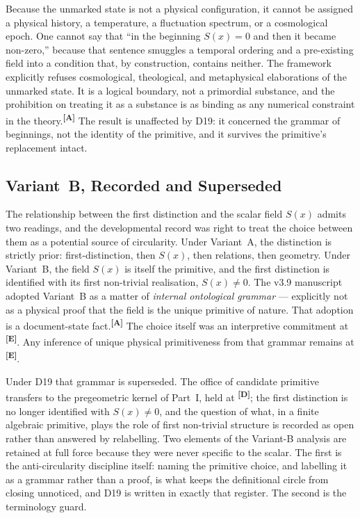 \documentclass[12pt,a4paper,twoside]{article}
\theoremstyle{plain}
\theoremstyle{definition}
\theoremstyle{remark}
\newcommand{\catmark}[1]{\textsuperscript{\textsf{\textbf{[#1]}}}}
\begin{document}
Because the unmarked state is not a physical configuration, it cannot be
assigned a physical history, a temperature, a fluctuation spectrum, or a
cosmological epoch. One cannot say that ``in the beginning $S(x)=0$ and
then it became non-zero,'' because that sentence smuggles a temporal
ordering and a pre-existing field into a condition that, by
construction, contains neither. The framework explicitly refuses
cosmological, theological, and metaphysical elaborations of the unmarked
state. It is a logical boundary, not a primordial substance, and the
prohibition on treating it as a substance is as binding as any numerical
constraint in the theory.\catmark{A} The result is unaffected by D19:
it concerned the grammar of beginnings, not the identity of the
primitive, and it survives the primitive's replacement intact.

\subsection{Variant~B, Recorded and Superseded}
\label{subsec:variant-b}

The relationship between the first distinction and the scalar field
$S(x)$ admits two readings, and the developmental record was right to
treat the choice between them as a potential source of circularity. Under
Variant~A, the distinction is strictly prior: first-distinction, then
$S(x)$, then relations, then geometry. Under Variant~B, the field
$S(x)$ is itself the primitive, and the first distinction is identified
with its first non-trivial realisation, $S(x)\neq 0$. The v3.9
manuscript adopted Variant~B as a matter of \emph{internal ontological
grammar} --- explicitly not as a physical proof that the field is the
unique primitive of nature. That adoption is a document-state fact.\catmark{A}
The choice itself was an interpretive commitment at \catmark{E}. Any inference
of unique physical primitiveness from that grammar remains at \catmark{E}.

Under D19 that grammar is superseded. The office of candidate primitive
transfers to the pregeometric kernel of Part~I, held at \catmark{D}; the
first distinction is no longer identified with $S(x)\neq 0$, and the
question of what, in a finite algebraic primitive, plays the role of
first non-trivial structure is recorded as open rather than answered by
relabelling. Two elements of the Variant-B analysis are retained at full
force because they were never specific to the scalar. The first is the
anti-circularity discipline itself: naming the primitive choice, and
labelling it as a grammar rather than a proof, is what keeps the
definitional circle from closing unnoticed, and D19 is written in
exactly that register. The second is the terminology guard.
\end{document}
